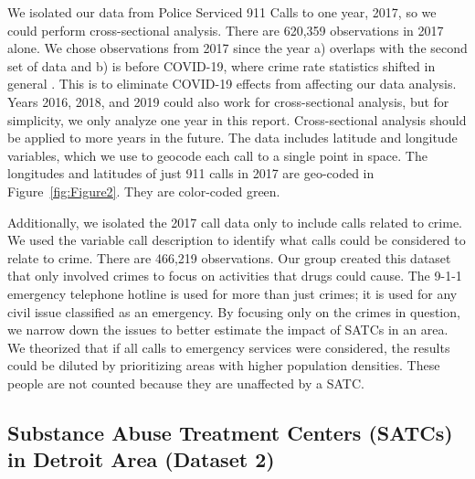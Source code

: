 \documentclass[12pt]{article}
\begin{document}
We isolated our data from Police Serviced 911 Calls to one year, 2017, so we could perform cross-sectional analysis. There are 620,359 observations in 2017 alone. We chose observations from 2017 since the year a) overlaps with the second set of data and b) is before COVID-19, where crime rate statistics shifted in general \cite{covid_and_crime}. This is to eliminate COVID-19 effects from affecting our data analysis. Years 2016, 2018, and 2019 could also work for cross-sectional analysis, but for simplicity, we only analyze one year in this report. Cross-sectional analysis should be applied to more years in the future. The data includes latitude and longitude variables, which we use to geocode each call to a single point in space. The longitudes and latitudes of just 911 calls in 2017 are geo-coded in Figure~\ref{fig:Figure2}. They are color-coded green. 

Additionally, we isolated the 2017 call data only to include calls related to crime. We used the variable call description to identify what calls could be considered to relate to crime. There are 466,219 observations. Our group created this dataset that only involved crimes to focus on activities that drugs could cause. The 9-1-1 emergency telephone hotline is used for more than just crimes; it is used for any civil issue classified as an emergency. By focusing only on the crimes in question, we narrow down the issues to better estimate the impact of SATCs in an area. We theorized that if all calls to emergency services were considered, the results could be diluted by prioritizing areas with higher population densities. These people are not counted because they are unaffected by a SATC.

\subsection{Substance Abuse Treatment Centers (SATCs) in Detroit Area (Dataset 2)}
\end{document}

